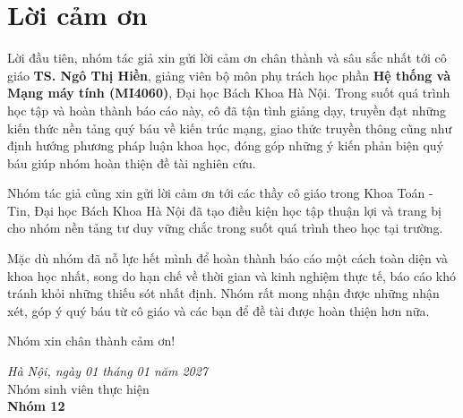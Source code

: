 \newpage
\chapter*{Lời cảm ơn}

Lời đầu tiên, nhóm tác giả xin gửi lời cảm ơn chân thành và sâu sắc nhất tới cô giáo \textbf{TS. Ngô Thị Hiền}, giảng viên bộ môn phụ trách học phần \textbf{Hệ thống và Mạng máy tính (MI4060)}, Đại học Bách Khoa Hà Nội. Trong suốt quá trình học tập và hoàn thành báo cáo này, cô đã tận tình giảng dạy, truyền đạt những kiến thức nền tảng quý báu về kiến trúc mạng, giao thức truyền thông cũng như định hướng phương pháp luận khoa học, đóng góp những ý kiến phản biện quý báu giúp nhóm hoàn thiện đề tài nghiên cứu.

Nhóm tác giả cũng xin gửi lời cảm ơn tới các thầy cô giáo trong Khoa Toán - Tin, Đại học Bách Khoa Hà Nội đã tạo điều kiện học tập thuận lợi và trang bị cho nhóm nền tảng tư duy vững chắc trong suốt quá trình theo học tại trường.

Mặc dù nhóm đã nỗ lực hết mình để hoàn thành báo cáo một cách toàn diện và khoa học nhất, song do hạn chế về thời gian và kinh nghiệm thực tế, báo cáo khó tránh khỏi những thiếu sót nhất định. Nhóm rất mong nhận được những nhận xét, góp ý quý báu từ cô giáo và các bạn để đề tài được hoàn thiện hơn nữa.

Nhóm xin chân thành cảm ơn!

\vspace{8mm}
\hspace{0.5\textwidth}
\begin{minipage}{0.5\textwidth}
	\noindent\begin{center}
		\textit{Hà Nội, ngày 01 tháng 01 năm 2027} \\
		Nhóm sinh viên thực hiện\\ \vspace{1.2cm}
		\textbf{Nhóm 12}
	\end{center}	
\end{minipage}
